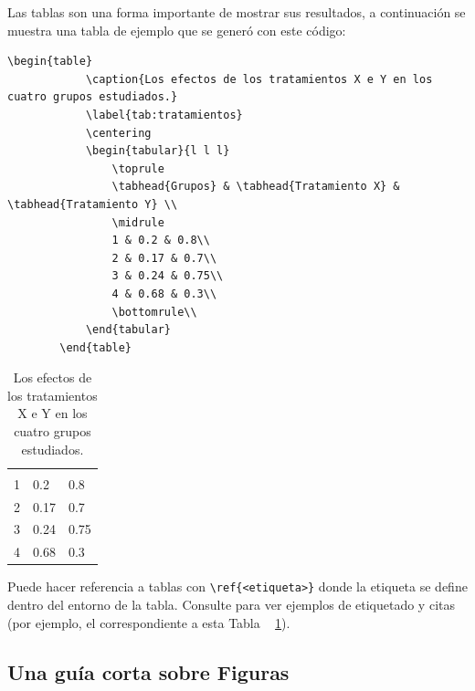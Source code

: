 Las tablas son una forma importante de mostrar sus resultados, a continuación se muestra una tabla de ejemplo que se generó con este código:

{\small
	\begin{lstlisting}[basicstyle=\small,tabsize=4]
		\begin{table}
			\caption{Los efectos de los tratamientos X e Y en los cuatro grupos estudiados.}
			\label{tab:tratamientos}
			\centering
			\begin{tabular}{l l l}
				\toprule
				\tabhead{Grupos} & \tabhead{Tratamiento X} & \tabhead{Tratamiento Y} \\
				\midrule
				1 & 0.2 & 0.8\\
				2 & 0.17 & 0.7\\
				3 & 0.24 & 0.75\\
				4 & 0.68 & 0.3\\
				\bottomrule\\
			\end{tabular}
		\end{table}
	\end{lstlisting}
}

\begin{table}
	\caption{Los efectos de los tratamientos X e Y en los cuatro grupos estudiados.}
	\label{tab:tratamientos}
	\centering
	\begin{tabular}{l l l}
		
		\tabhead{Grupos} & \tabhead{Tratamiento X} & \tabhead{Tratamiento Y} \\
		
		1 & 0.2 & 0.8\\
		2 & 0.17 & 0.7\\
		3 & 0.24 & 0.75\\
		4 & 0.68 & 0.3\\
		
	\end{tabular}
\end{table}

Puede hacer referencia a tablas con \verb|\ref{<etiqueta>}| donde la etiqueta se define dentro del entorno de la tabla. Consulte  para ver  ejemplos de etiquetado y citas (por ejemplo, el correspondiente a esta Tabla ~ \ref{tab:tratamientos}).


\subsection{Una guía corta sobre Figuras}


